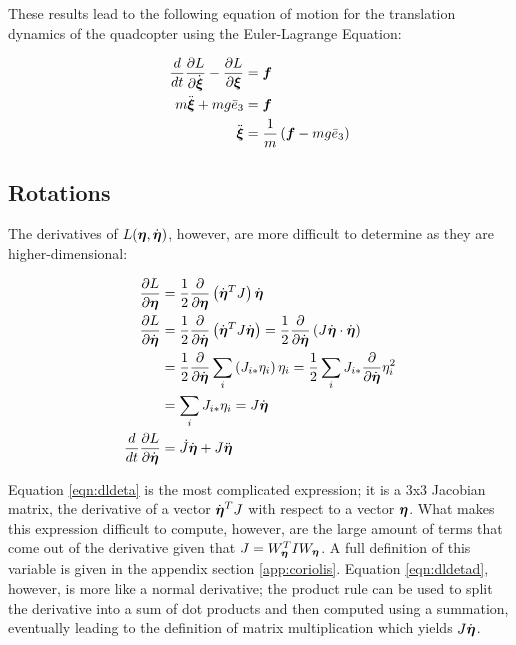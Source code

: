 \documentclass{article}
\begin{document}
These results lead to the following equation of motion for the translation dynamics of the quadcopter using the Euler-Lagrange Equation:

\newcommand{\sQ}{\boldsymbol{Q}}

\begin{align}
    \frac{d }{d t} \frac{\partial L}{\partial \dot{\boldsymbol{\xi}}} - \frac{\partial L}{\partial \boldsymbol{\xi}} & = \boldsymbol{f} \\
    m \ddot{\boldsymbol{\xi}} + m g \bar{e}_3 & = \boldsymbol{f} \\
    \ddot{\boldsymbol{\xi}} & = \frac{1}{m} \left( \boldsymbol{f} - mg \bar{e}_3 \right)
\end{align}

\subsection{Rotations}

The derivatives of $L(\boldsymbol{\eta}, \dot{\boldsymbol{\eta}})$, however, are more difficult to determine as they are higher-dimensional:

\begin{align}
    \frac{\partial L}{\partial \boldsymbol{\eta}} & = 
    \frac{1}{2} \frac{\partial }{\partial \boldsymbol{\eta}} \left( \dot{\boldsymbol{\eta}}^T J \right) \dot{\boldsymbol{\eta}} 
    \label{eqn:dldeta} \\
    \frac{\partial L}{\partial \dot{\boldsymbol{\eta}}}
    & = \frac{1}{2} \frac{\partial }{\partial \dot{\boldsymbol{\eta}}} \left( \dot{\boldsymbol{\eta}}^T J \dot{\boldsymbol{\eta}} \right) \nonumber
    = \frac{1}{2} \frac{\partial }{\partial \dot{\boldsymbol{\eta}}} \left( J \dot{\boldsymbol{\eta}} \cdot \dot{\boldsymbol{\eta}} \right) \\
    & = \frac{1}{2} \frac{\partial }{\partial \dot{\boldsymbol{\eta}}} \sum_i \left( J_{i *} \eta_i \right) \eta_i
    = \frac{1}{2} \sum_i J_{i *} \frac{\partial }{\partial \dot{\boldsymbol{\eta}}} \eta_i^2 \nonumber \\
    & = \sum_i J_{i *} \eta_i = J \dot{\boldsymbol{\eta}} 
    \label{eqn:dldetad} \\
    \frac{d }{d t} \frac{\partial L}{\partial \dot{\boldsymbol{\eta}}} & = \dot{J} \dot{\boldsymbol{\eta}} + J \ddot{\boldsymbol{\eta}}
    \label{eqn:ddtdldetad}
\end{align}

Equation \ref{eqn:dldeta} is the most complicated expression; it is a 3x3 Jacobian matrix, the derivative of a vector $\dot{\boldsymbol{\eta}}^T J$ with respect to a vector $\boldsymbol{\eta}$. What makes this expression difficult to compute, however, are the large amount of terms that come out of the derivative given that $J = W_{\boldsymbol{\eta}}^T I W_{\boldsymbol{\eta}}$. A full definition of this variable is given in the appendix section \ref{app:coriolis}. Equation \ref{eqn:dldetad}, however, is more like a normal derivative; the product rule can be used to split the derivative into a sum of dot products and then computed using a summation, eventually leading to the definition of matrix multiplication which yields $J \dot{\boldsymbol{\eta}}$.
\end{document}

